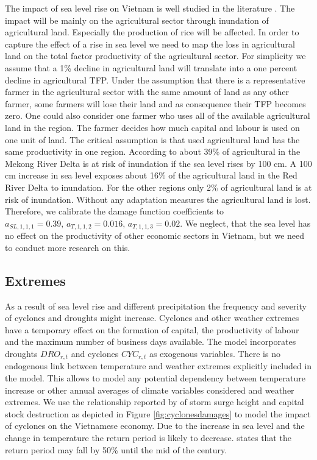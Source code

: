 \documentclass[10pt,a4paper]{article}
\begin{document}
The impact of sea level rise on Vietnam is well studied in the literature \citep{wassmann2004sea,arndt2015economic,chen2012climate,thuc2016climate,boateng2012GIS}. The impact will be mainly on the agricultural sector through inundation of agricultural land. Especially the production of rice will be affected. In order to capture the effect of a rise in sea level we need to map the loss in agricultural land on the total factor productivity of the agricultural sector. For simplicity we assume that a 1\% decline in agricultural land will translate into a one percent decline in agricultural TFP. Under the assumption that there is a representative farmer in the agricultural sector with the same amount of land as any other farmer, some farmers will lose their land and as consequence their TFP becomes zero. One could also consider one farmer who uses all of the available agricultural land in the region. The farmer decides how much capital and labour is used on one unit of land. The critical assumption is that used agricultural land has the same productivity in one region. According to \cite{thuc2016climate} about 39\% of agricultural in the Mekong River Delta is at risk of inundation if the sea level rises by 100 cm. A 100 cm increase in sea level exposes about 16\% of the agricultural land in the Red River Delta to inundation. For the other regions only 2\% of agricultural land is at risk of inundation. Without any adaptation measures the agricultural land is lost. Therefore, we calibrate the damage function coefficients to $a_{SL,1,1,1} = 0.39, \, a_{T,1,1,2} = 0.016, \, a_{T,1,1,3} = 0.02$. We neglect, that the sea level has no effect on the productivity of other economic sectors in Vietnam, but we need to conduct more research on this.

\subsection{Extremes}

As a result of sea level rise and different precipitation the frequency and severity of cyclones and droughts might increase. Cyclones and other weather extremes have a temporary effect on the formation of capital, the productivity of labour and the maximum number of business days available. The model incorporates droughts $DRO_{r,t}$ and cyclones $CYC_{r,t}$ as exogenous variables. There is no endogenous link between temperature and weather extremes explicitly included in the model. This allows to model any potential dependency between temperature increase or other annual averages of climate variables considered and weather extremes. We use the relationship reported by \cite{arndt2015economic} of storm surge height and capital stock destruction as depicted in Figure \ref{fig:cyclonesdamages} to model the impact of cyclones on the Vietnamese economy. Due to the increase in sea level and the change in temperature the return period is likely to decrease. \cite{arndt2015economic} states that the return period may fall by 50\% until the mid of the century. 
\end{document}
